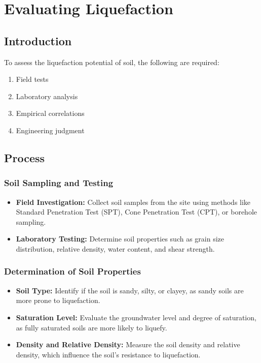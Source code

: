 \chapter{Evaluating Liquefaction}

\section{Introduction}
To assess the liquefaction potential of soil, the following are required:
\begin{enumerate}
    \item Field tests
    \item Laboratory analysis
    \item Empirical correlations
    \item Engineering judgment
\end{enumerate}

\section{Process}

\subsection{Soil Sampling and Testing}
\begin{itemize}
    \item \textbf{Field Investigation:} Collect soil samples from the site using methods like Standard Penetration Test (SPT), Cone Penetration Test (CPT), or borehole sampling.
    \item \textbf{Laboratory Testing:} Determine soil properties such as grain size distribution, relative density, water content, and shear strength.
\end{itemize}

\subsection{Determination of Soil Properties}
\begin{itemize}
    \item \textbf{Soil Type:} Identify if the soil is sandy, silty, or clayey, as sandy soils are more prone to liquefaction.
    \item \textbf{Saturation Level:} Evaluate the groundwater level and degree of saturation, as fully saturated soils are more likely to liquefy.
    \item \textbf{Density and Relative Density:} Measure the soil density and relative density, which influence the soil's resistance to liquefaction.
\end{itemize}

